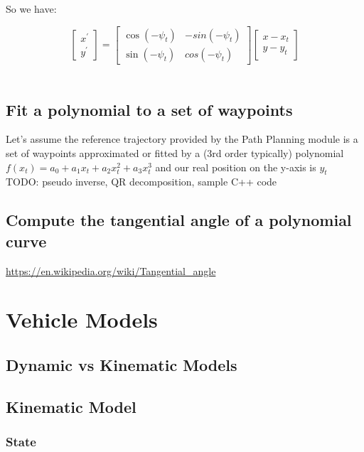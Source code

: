\documentclass[11pt]{article}
\begin{document}
So we have:

$$ \begin{bmatrix}
x^{'} \\ 
y^{'}
\end{bmatrix} = \begin{bmatrix}
\cos(-\psi_t) & -sin(-\psi_t) \\ 
\sin(-\psi_t) & cos(-\psi_t)
\end{bmatrix} \begin{bmatrix}
x - x_t \\ 
y - y_t
\end{bmatrix} $$ \\

\subsection{Fit a polynomial to a set of waypoints}

Let's assume the reference trajectory provided by the Path Planning module is a set of waypoints approximated or fitted by a (3rd order typically) polynomial $f(x_t)= a_0 + a_1 x_t + a_2 x_t^2 + a_3 x_t^3$ and our real position on the y-axis is $y_t$ \\

TODO: pseudo inverse, QR decomposition, sample C++ code

\subsection{Compute the tangential angle of a polynomial curve}

\url{https://en.wikipedia.org/wiki/Tangential_angle}

\section{Vehicle Models}

\subsection{Dynamic vs Kinematic Models}

\subsection{Kinematic Model}

\subsubsection{State}
\end{document}

